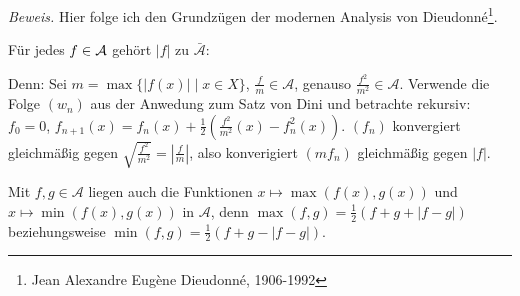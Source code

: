 \documentclass[12pt]{scrbook}   %
\newcommand{\da}{\coloneqq}
\begin{document}


{\it Beweis.}  Hier folge ich den Grundzügen der modernen Analysis
von Dieudonn\'e\footnote{Jean Alexandre Eug\`ene Dieudonn\'e, 1906-1992}.



%

Für jedes $f\in {\cal A}$ gehört $|f|$ zu $\bar{\mathcal A}$:

Denn: Sei $m=\max\{|f(x)|\mid x\in X\}$, $\frac fm\in \mathcal A$, genauso $\frac{f^2}{m^2} \in \mathcal A$. Verwende die Folge $(w_n)$ aus der Anwedung zum Satz von Dini und betrachte rekursiv: $f_0=0$, $f_{n+1}(x) = f_n(x) + \frac12(\frac {f^2}{m^2}(x) - f_n^2(x))$. $(f_n)$ konvergiert gleichmäßig gegen $\sqrt {\frac{f^2}{m^2}} = |\frac fm|$, also konverigiert $(mf_n)$ gleichmäßig gegen $|f|$.

Mit $f,g \in \mathcal A$ liegen auch die Funktionen $x\mapsto \max(f(x),g(x))$ und $x\mapsto \min(f(x),g(x))$ in $\mathcal A$, denn $\max(f,g)=\frac 12(f+g+|f-g|)$ beziehungsweise $\min(f,g) = \frac12 (f + g -|f-g|)$.


%
\end{document}
